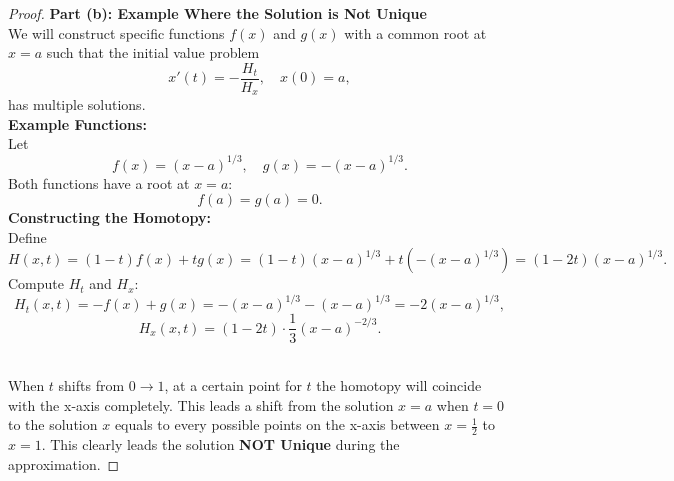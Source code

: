 \documentclass{article}
\begin{document}
\begin{proof}
    \textbf{Part (b): Example Where the Solution is Not Unique}
    \\
    We will construct specific functions \( f(x) \) and \( g(x) \) with a common root at \( x = a \) such that the initial value problem
    \[
        x'(t) = -\frac{H_t}{H_x}, \quad x(0) = a,
    \]
    has multiple solutions.
    \\
    \textbf{Example Functions:}
    \\
    Let
    \[
        f(x) = (x - a)^{1/3}, \quad g(x) = -(x - a)^{1/3}.
    \]
    Both functions have a root at \( x = a \):
    \[
        f(a) = g(a) = 0.
    \]
    \textbf{Constructing the Homotopy:}
    \\
    Define
    \[
        H(x, t) = (1 - t) f(x) + t g(x) = (1 - t)(x - a)^{1/3} + t ( - (x - a)^{1/3} ) = (1 - 2t)(x - a)^{1/3}.
    \]
    Compute \( H_t \) and \( H_x \):
    \[
        H_t(x, t) = -f(x) + g(x) = - (x - a)^{1/3} - (x - a)^{1/3} = -2 (x - a)^{1/3},
    \]
    \[
        H_x(x, t) = (1 - 2t) \cdot \frac{1}{3} (x - a)^{-2/3}.
    \]

    \\
    When $t$ shifts from $0 \to 1$, at a certain point for $t$ the homotopy will coincide with the x-axis completely. 
    This leads a shift from the solution $x=a$ when $t=0$ to the solution $x$ equals to every possible points on the x-axis between $x = \frac{1}{2}$ to $x = 1$.
    This clearly leads the solution \textbf{NOT Unique} during the approximation.

\end{proof}
\end{document}

